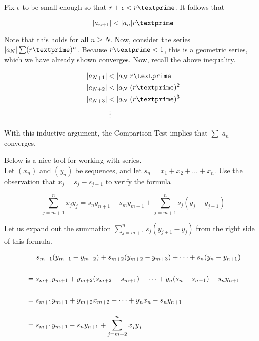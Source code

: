 \documentclass{article}
\begin{document}
Fix $\epsilon$ to be small enough so that $r+\epsilon < r\textprime$. It follows that 

\begin{equation}
    |a_{n+1}| < |a_n|r\textprime
\end{equation}

Note that this holds for all $n \geq N$. Now, consider the series $|a_N|\sum (r\textprime)^n$. Because $r\textprime < 1$, this is a geometric series, which we have already shown converges. Now, recall the above inequality. 

\begin{equation}
\begin{split}
    & |a_{N+1}| < |a_N|r\textprime \\
    & |a_{N+2}| < |a_N|(r\textprime)^2 \\
    & |a_{N+3}| < |a_N|(r\textprime)^3 \\
    & \hspace{11 mm} \vdots
\end{split}
\end{equation}

With this inductive argument, the Comparison Test implies that $\sum |a_n|$ converges. \\

\newpage

Below is a nice tool for working with series. \\

Let $(x_n)$ and $(y_n)$ be sequences, and let $s_n = x_1 + x_2 + \dots + x_n$. Use the observation that $x_j = s_j - s_{j-1}$ to verify the formula

\begin{equation}
    \sum_{j=m+1}^{n} x_j y_j = s_n y_{n+1} - s_m y_{m+1} + \sum_{j=m+1}^{n} s_j(y_{j} - y_{j+1})
\end{equation}

Let us expand out the summation $\sum_{j=m+1}^{n} s_j(y_{j+1} - y_j)$ from the right side of this formula. 

\begin{equation}
\begin{split}
    & \hspace{5 mm} s_{m+1}(y_{m+1} - y_{m+2}) + s_{m+2}(y_{m+2} - y_{m+3}) + \dots + s_{n}(y_{n} - y_{n+1}) \\[15pt]
    & = s_{m+1}y_{m+1} + y_{m+2}(s_{m+2} - s_{m+1}) + \dots + y_n(s_{n} - s_{n-1}) - s_n y_{n+1} \\[15pt]
    & = s_{m+1}y_{m+1} + y_{m+2}x_{m+2} + \dots + y_n x_n - s_n y_{n+1} \\[10pt]
    & = s_{m+1}y_{m+1} - s_n y_{n+1} + \sum_{j=m+2}^{n} x_j y_j
\end{split}
\end{equation}
\end{document}
